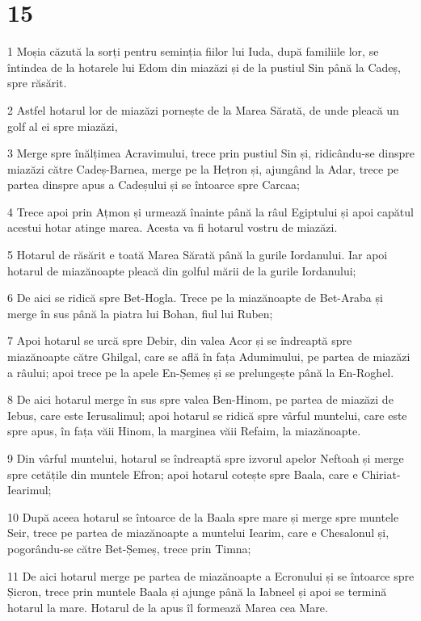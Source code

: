 \chapter{15}

\par 1 Moșia căzută la sorți pentru seminția fiilor lui Iuda, după familiile lor, se întindea de la hotarele lui Edom din miazăzi și de la pustiul Sin până la Cadeș, spre răsărit.
\par 2 Astfel hotarul lor de miazăzi pornește de la Marea Sărată, de unde pleacă un golf al ei spre miazăzi,
\par 3 Merge spre înălțimea Acravimului, trece prin pustiul Sin și, ridicându-se dinspre miazăzi către Cadeș-Barnea, merge pe la Hețron și, ajungând la Adar, trece pe partea dinspre apus a Cadeșului și se întoarce spre Carcaa;
\par 4 Trece apoi prin Ațmon și urmează înainte până la râul Egiptului și apoi capătul acestui hotar atinge marea. Acesta va fi hotarul vostru de miazăzi.
\par 5 Hotarul de răsărit e toată Marea Sărată până la gurile Iordanului. Iar apoi hotarul de miazănoapte pleacă din golful mării de la gurile Iordanului;
\par 6 De aici se ridică spre Bet-Hogla. Trece pe la miazănoapte de Bet-Araba și merge în sus până la piatra lui Bohan, fiul lui Ruben;
\par 7 Apoi hotarul se urcă spre Debir, din valea Acor și se îndreaptă spre miazănoapte către Ghilgal, care se află în fața Adumimului, pe partea de miazăzi a râului; apoi trece pe la apele En-Șemeș și se prelungește până la En-Roghel.
\par 8 De aici hotarul merge în sus spre valea Ben-Hinom, pe partea de miazăzi de Iebus, care este Ierusalimul; apoi hotarul se ridică spre vârful muntelui, care este spre apus, în fața văii Hinom, la marginea văii Refaim, la miazănoapte.
\par 9 Din vârful muntelui, hotarul se îndreaptă spre izvorul apelor Neftoah și merge spre cetățile din muntele Efron; apoi hotarul cotește spre Baala, care e Chiriat-Iearimul;
\par 10 După aceea hotarul se întoarce de la Baala spre mare și merge spre muntele Seir, trece pe partea de miazănoapte a muntelui Iearim, care e Chesalonul și, pogorându-se către Bet-Șemeș, trece prin Timna;
\par 11 De aici hotarul merge pe partea de miazănoapte a Ecronului și se întoarce spre Șicron, trece prin muntele Baala și ajunge până la Iabneel și apoi se termină hotarul la mare. Hotarul de la apus îl formează Marea cea Mare.
